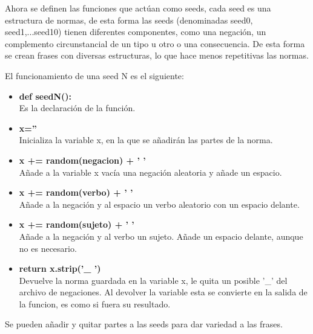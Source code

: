 \documentclass[12pt,twocolumn]{article}
\begin{document}
Ahora se definen las funciones que actúan como seeds, cada seed es una estructura
de normas, de esta forma las seeds (denominadas seed0, seed1,...seed10) tienen
diferentes componentes, como una negación, un complemento circunstancial de un tipo
u otro o una consecuencia. De esta forma se crean frases con diversas estructuras,
lo que hace menos repetitivas las normas.

El funcionamiento de una seed N es el siguiente:
	\begin{itemize}
	\setlength\itemsep{-0.3em}
    \item \textbf{def seedN(): }\\ Es la declaración de la función.
    \item  \textbf{x='' } \\ Inicializa la variable x, en la que se añadirán las partes de la norma.
    \item \textbf{x += random(negacion) + ' ' } \\ Añade a la variable x vacía una negación aleatoria y añade un espacio.
    \item \textbf{x += random(verbo) + ' ' } \\ Añade a la negación y al espacio un verbo aleatorio con un espacio delante.
    \item \textbf{x += random(sujeto) + ' ' } \\ Añade a la negación y al verbo un sujeto. Añade un espacio delante, aunque no es necesario.
    \item \textbf{return x.strip('\_ ') } \\ Devuelve la norma guardada en la variable x, le quita un posible '\_' del archivo de negaciones. Al devolver la variable esta se convierte en la salida de la funcion, es como si fuera su resultado.
	\end{itemize}
Se pueden añadir y quitar partes a las seeds para dar variedad a las frases.
\end{document}
